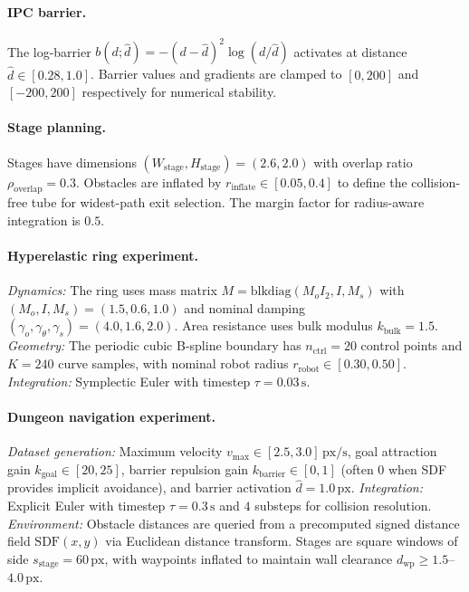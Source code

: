 \documentclass{article} %
\begin{document}
\paragraph{IPC barrier.}
The log-barrier $b(d; \hat{d}) = -(d - \hat{d})^2 \log(d/\hat{d})$ activates at distance $\hat{d} \in [0.28, 1.0]$. Barrier values and gradients are clamped to $[0, 200]$ and $[-200, 200]$ respectively for numerical stability.

\paragraph{Stage planning.}
Stages have dimensions $(W_{\mathrm{stage}}, H_{\mathrm{stage}}) = (2.6, 2.0)$ with overlap ratio $\rho_{\mathrm{overlap}} = 0.3$. Obstacles are inflated by $r_{\mathrm{inflate}} \in [0.05, 0.4]$ to define the collision-free tube for widest-path exit selection. The margin factor for radius-aware integration is $0.5$.

\paragraph{Hyperelastic ring experiment.}
\emph{Dynamics:} The ring uses mass matrix $M = \mathrm{blkdiag}(M_o I_2, I, M_s)$ with $(M_o, I, M_s) = (1.5, 0.6, 1.0)$ and nominal damping $(\gamma_o, \gamma_\theta, \gamma_s) = (4.0, 1.6, 2.0)$. Area resistance uses bulk modulus $k_{\mathrm{bulk}} = 1.5$. 
\emph{Geometry:} The periodic cubic B-spline boundary has $n_{\mathrm{ctrl}} = 20$ control points and $K = 240$ curve samples, with nominal robot radius $r_{\mathrm{robot}} \in [0.30, 0.50]$.
\emph{Integration:} Symplectic Euler with timestep $\tau = 0.03\,\mathrm{s}$.

\paragraph{Dungeon navigation experiment.}
\emph{Dataset generation:} Maximum velocity $v_{\max} \in [2.5, 3.0]\,\mathrm{px/s}$, goal attraction gain $k_{\mathrm{goal}} \in [20, 25]$, barrier repulsion gain $k_{\mathrm{barrier}} \in [0, 1]$ (often $0$ when SDF provides implicit avoidance), and barrier activation $\hat{d} = 1.0\,\mathrm{px}$.
\emph{Integration:} Explicit Euler with timestep $\tau = 0.3\,\mathrm{s}$ and $4$ substeps for collision resolution.
\emph{Environment:} Obstacle distances are queried from a precomputed signed distance field $\mathrm{SDF}(x,y)$ via Euclidean distance transform. Stages are square windows of side $s_{\mathrm{stage}} = 60\,\mathrm{px}$, with waypoints inflated to maintain wall clearance $d_{\mathrm{wp}} \geq 1.5$--$4.0\,\mathrm{px}$.
\end{document}
